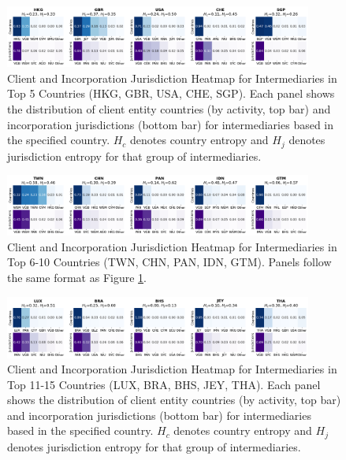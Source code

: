 \begin{figure}[htbp]
    \centering
    \includegraphics[width=0.9\textwidth]{images/Geography_Country_Heatmaps_Top5.png}
    \caption{Client and Incorporation Jurisdiction Heatmap for Intermediaries in Top 5 Countries (HKG, GBR, USA, CHE, SGP). Each panel shows the distribution of client entity countries (by activity, top bar) and incorporation jurisdictions (bottom bar) for intermediaries based in the specified country. $H_c$ denotes country entropy and $H_j$ denotes jurisdiction entropy for that group of intermediaries.}
    \label{fig:geography_country_heatmaps_top5}
\end{figure}
\begin{figure}[htbp]
    \centering
    \includegraphics[width=0.9\textwidth]{images/Geography_Country_Heatmaps_Top6_10.png}
    \caption{Client and Incorporation Jurisdiction Heatmap for Intermediaries in Top 6-10 Countries (TWN, CHN, PAN, IDN, GTM). Panels follow the same format as Figure \ref{fig:geography_country_heatmaps_top5}.}
    \label{fig:geography_country_heatmaps_top6_10}
\end{figure}
\begin{figure}[htbp]
    \centering
    \includegraphics[width=0.9\textwidth]{images/Geography_Country_Heatmaps_Top11_15.png}
    \caption{Client and Incorporation Jurisdiction Heatmap for Intermediaries in Top 11-15 Countries (LUX, BRA, BHS, JEY, THA). Each panel shows the distribution of client entity countries (by activity, top bar) and incorporation jurisdictions (bottom bar) for intermediaries based in the specified country. $H_c$ denotes country entropy and $H_j$ denotes jurisdiction entropy for that group of intermediaries.}
    \label{fig:geography_country_heatmaps_top11_15}
\end{figure}

